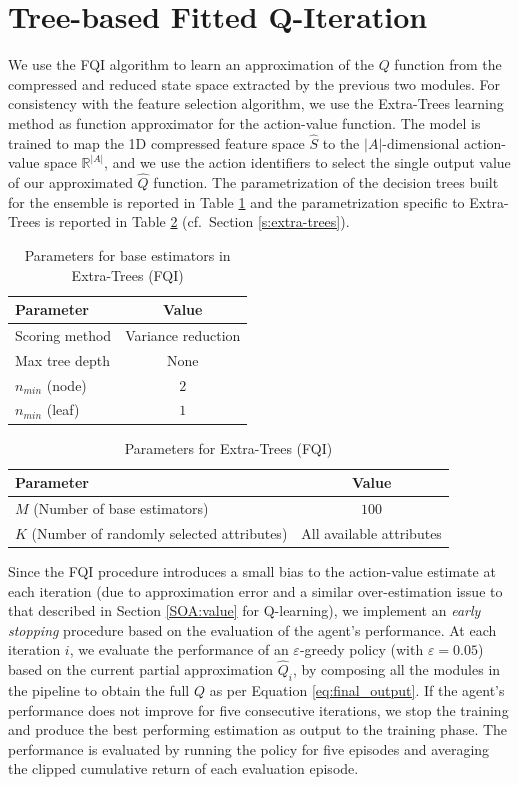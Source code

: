 \section{Tree-based Fitted Q-Iteration}
We use the FQI algorithm to learn an approximation of the $Q$ function from the
compressed and reduced state space extracted by the previous two modules. 
For consistency with the feature selection algorithm, we use the Extra-Trees 
learning method as function approximator for the action-value function.
The model is trained to map the 1D compressed feature space $\hat{S}$ to the 
$|A|$-dimensional action-value space $\mathbb{R}^{|A|}$, and we use the action 
identifiers to select the single output value of our approximated $\hat{Q}$ 
function. 
The parametrization of the decision trees built for the ensemble is reported in
Table \ref{t:FQI_tree_params} and the parametrization specific to Extra-Trees 
is reported in Table \ref{t:FQI_extra_params} (cf.\ Section \ref{s:extra-trees}).
%
\begin{table}[h]	
    \centering
    \begin{tabular}{l c} 
	\hline
	Parameter & Value \\ 
	\hline 
	Scoring method &  Variance reduction \\
	Max tree depth & None \\
	$n_{min}$ (node) & $2$\\
	$n_{min}$ (leaf) & $1$ \\
	\hline
    \end{tabular}
    \caption{Parameters for base estimators in Extra-Trees (FQI)}
    \label{t:FQI_tree_params}
\end{table}
%
%
\begin{table}[h]
    \centering
    \begin{tabular}{l c} 
	\hline
	Parameter & Value \\ 
	\hline 
	$M$ (Number of base estimators) & $100$ \\
	$K$ (Number of randomly selected attributes) &  All available attributes \\
	\hline
    \end{tabular}
    \caption{Parameters for Extra-Trees (FQI)}
    \label{t:FQI_extra_params}
\end{table}
%

Since the FQI procedure introduces a small bias to the action-value estimate at 
each iteration (due to approximation error and a similar over-estimation issue 
to that described in Section \ref{SOA:value} for Q-learning), we implement an 
\textit{early stopping} procedure based on the evaluation of the agent's 
performance.
At each iteration $i$, we evaluate the performance of an $\varepsilon$-greedy 
policy (with $\varepsilon = 0.05$) based on the current partial approximation 
$\hat{Q}_i$, by composing all the modules in the pipeline to obtain the full $Q$ 
as per Equation \eqref{eq:final_output}. 
If the agent's performance does not improve for five consecutive iterations, we 
stop the training and produce the best performing estimation as output to the training phase.
The performance is evaluated by running the policy for five episodes and 
averaging the clipped cumulative return of each evaluation episode. 

